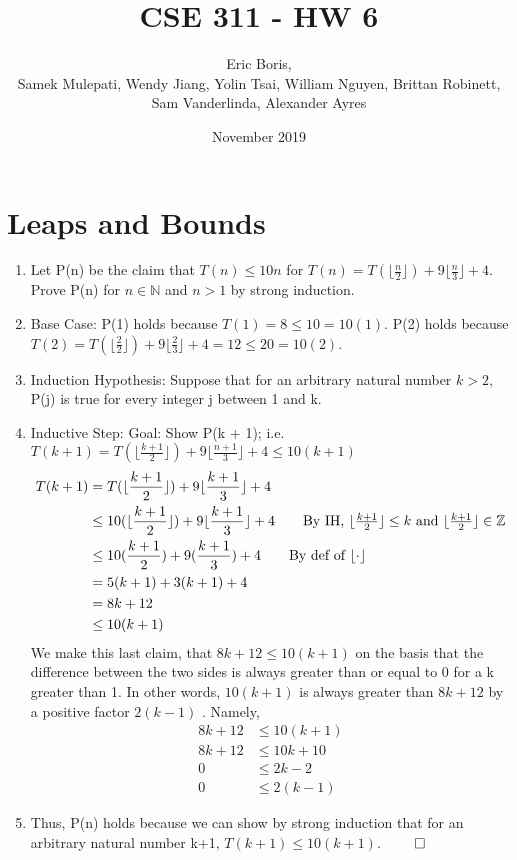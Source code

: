 \documentclass[11pt]{article}
\title{CSE 311 - HW 6}
\author{Eric Boris, \\ Samek Mulepati, Wendy Jiang, Yolin Tsai, William Nguyen, Brittan Robinett, Sam Vanderlinda, Alexander Ayres}
\date{November 2019}
\makeatletter
\renewcommand{\maketitle}{\bgroup\setlength{\parindent}{0pt}
\begin{flushleft}
  \textbf{\@title}

  \@author
  
  \@date
\end{flushleft}\egroup
}
\newcommand{\N}{\mathbb{N}}
\newcommand{\Z}{\mathbb{Z}}
\makeatother
\begin{document}
\maketitle

\section{Leaps and Bounds} %
\begin{enumerate}
	\item Let P(n) be the claim that $T(n) \leq 10n$ for $T(n) = T(\lfloor \frac{n}{2} \rfloor) + 9 \lfloor \frac{n}{3} \rfloor + 4$. Prove P(n) for $n \in \N$ and $n > 1$ by strong induction. 
	\item Base Case: P(1) holds because $T(1) = 8 \leq 10 = 10(1)$. P(2) holds because $T(2) = T(\lfloor \frac{2}{2} \rfloor) + 9 \lfloor \frac{2}{3} \rfloor + 4 = 12 \leq 20 = 10(2)$.
	\item Induction Hypothesis: Suppose that for an arbitrary natural number $k > 2$, P(j) is true for every integer j between 1 and k. 
	\item Inductive Step: Goal: Show P(k + 1); i.e. $T(k + 1) = T(\lfloor \frac{k+1}{2} \rfloor)  + 9 \lfloor \frac{n+1}{3} \rfloor + 4 \leq 10(k+1)$
	\begin{align*}
		T(k+1) &= T(\lfloor \frac{k+1}{2} \rfloor) + 9 \lfloor \frac{k+1}{3} \rfloor + 4 \\
		&\leq 10(\lfloor \frac{k+1}{2} \rfloor) + 9 \lfloor \frac{k+1}{3} \rfloor + 4 \tag*{By IH, $\lfloor \frac{k+1}{2}\rfloor \leq k$ and $\lfloor \frac{k+1}{2} \rfloor \in \Z$} \\
		&\leq 10(\frac{k+1}{2}) + 9(\frac{k+1}{3}) + 4 \tag*{By def of $\lfloor \cdot \rfloor$} \\
		&= 5(k+1) + 3(k+1) + 4 \\
		&= 8k + 12 \\
		&\leq 10(k + 1) \\
	\end{align*}
	We make this last claim, that $8k + 12 \leq 10(k + 1)$ on the basis that the difference between the two sides is always greater than or equal to 0 for a k greater than 1. In other words, $10(k+1)$ is always greater than $8k+12$ by a positive factor $2(k-1)$ . Namely,
	\begin{align*}
		8k + 12 &\leq 10(k + 1) \\
		8k + 12 &\leq 10k + 10 \\
		0 &\leq 2k - 2 \\
		0 &\leq 2(k - 1)
	\end{align*}
	\item Thus, P(n) holds because we can show by strong induction that for an arbitrary natural number k+1, $T(k+1) \leq 10(k+1)$. $\qed$
\end{enumerate}
\end{document}
